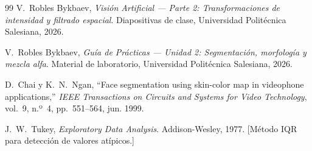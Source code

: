 \documentclass[12pt, a4paper]{article}
\begin{document}
\begin{thebibliography}{99}
V.~Robles Bykbaev,
\textit{Visión Artificial — Parte 2: Transformaciones de intensidad y filtrado espacial}.
Diapositivas de clase, Universidad Politécnica Salesiana, 2026.

V.~Robles Bykbaev,
\textit{Guía de Prácticas — Unidad 2: Segmentación, morfología y mezcla alfa}.
Material de laboratorio, Universidad Politécnica Salesiana, 2026.

D.~Chai y K.~N.~Ngan,
``Face segmentation using skin-color map in videophone applications,''
\textit{IEEE Transactions on Circuits and Systems for Video Technology},
vol.~9, n.º~4, pp.~551--564, jun. 1999.

J.~W.~Tukey,
\textit{Exploratory Data Analysis}.
Addison-Wesley, 1977.
[Método IQR para detección de valores atípicos.]

\end{thebibliography}
\end{document}
